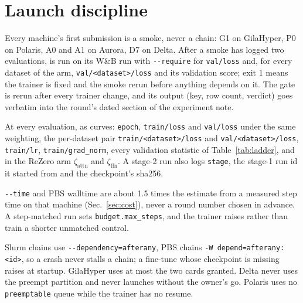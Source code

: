 
\section{Launch discipline}
\label{sec:launch}

Every machine's first submission is a smoke, never a chain: G1 on GilaHyper, P0 on Polaris,
A0 and A1 on Aurora, D7 on Delta. After a smoke has logged two evaluations,
 is run on its W\&B run with \texttt{-{}-require} for
\texttt{val/loss} and, for every dataset of the arm, \texttt{val/<dataset>/loss} and its
validation score; exit 1 means the trainer is fixed and the smoke rerun before anything depends
on it. The gate is rerun after every trainer change, and its output (key, row count, verdict)
goes verbatim into the round's dated section of the experiment note.

At every evaluation, as curves: \texttt{epoch}, \texttt{train/loss} and \texttt{val/loss} under
the same weighting, the per-dataset pair \texttt{train/<dataset>/loss} and
\texttt{val/<dataset>/loss}, \texttt{train/lr}, \texttt{train/grad\_norm}, every validation
statistic of Table~\ref{tab:ladder}, and in the ReZero arm $\zeta_{\mathrm{attn}}$ and
$\zeta_{\mathrm{ffn}}$. A stage-2 run also logs \texttt{stage}, the stage-1 run id it started
from and the checkpoint's sha256.

\texttt{-{}-time} and PBS walltime are about 1.5 times the estimate from a measured step time on
that machine (Sec.~\ref{sec:cost}), never a round number chosen in advance. A step-matched run
sets \texttt{budget.max\_steps}, and the trainer raises rather than train a shorter unmatched
control.

Slurm chains use \texttt{-{}-dependency=afterany}, PBS chains \texttt{-W depend=afterany:<id>},
so a crash never stalls a chain; a fine-tune whose checkpoint is missing raises at startup.
GilaHyper uses at most the two cards granted. Delta never uses the preempt partition and never
launches without the owner's go. Polaris uses no \texttt{preemptable} queue while the trainer
has no resume.

